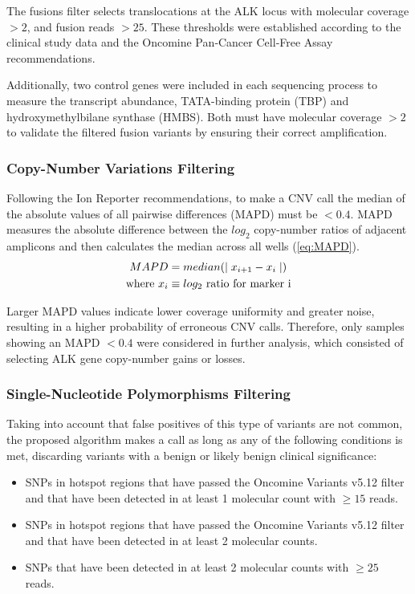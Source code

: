 The fusions filter selects translocations at the ALK locus with molecular coverage $> 2$, and fusion reads $> 25$. These thresholds were established according to the clinical study data and the Oncomine\texttrademark{} Pan‐Cancer Cell‐Free Assay recommendations.

Additionally, two control genes were included in each sequencing process to measure the transcript abundance, TATA-binding protein (TBP) and hydroxymethylbilane synthase (HMBS). Both must have molecular coverage $> 2$ to validate the filtered fusion variants by ensuring their correct amplification.

\subsubsection{Copy-Number Variations Filtering}

Following the Ion Reporter\texttrademark{} recommendations, to make a CNV call the median of the absolute values of all pairwise differences (MAPD) must be $< 0.4$. MAPD measures the absolute difference between the $log_2$ copy-number ratios of adjacent amplicons and then calculates the median across all wells (\autoref{eq:MAPD}).
\begin{align} \label{eq:MAPD}
    MAPD &= median(\mid x_{i+1}-x_i \mid) \\
    \text{where}~
    x_i &\equiv \text{$log_2$ ratio for marker i} \notag
\end{align}

Larger MAPD values indicate lower coverage uniformity and greater noise, resulting in a higher probability of erroneous CNV calls. Therefore, only samples showing an MAPD $< 0.4$ were considered in further analysis, which consisted of selecting ALK gene copy-number gains or losses.

\subsubsection{Single-Nucleotide Polymorphisms Filtering}

Taking into account that false positives of this type of variants are not common, the proposed algorithm makes a call as long as any of the following conditions is met, discarding variants with a benign or likely benign clinical significance:
\begin{itemize}
    \item SNPs in hotspot regions that have passed the Oncomine\texttrademark{} Variants v5.12 filter and that have been detected in at least 1 molecular count with $\ge 15$ reads.
    \item SNPs in hotspot regions that have passed the Oncomine\texttrademark{} Variants v5.12 filter and that have been detected in at least 2 molecular counts.
    \item SNPs that have been detected in at least 2 molecular counts with $\ge 25$ reads.
\end{itemize}

